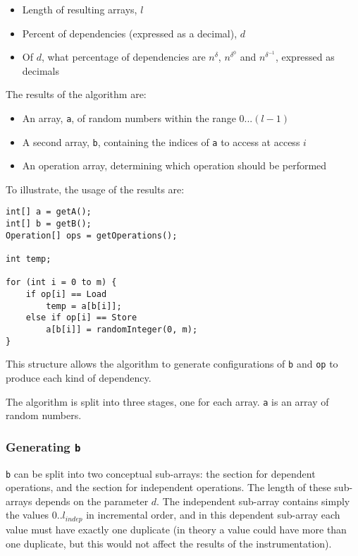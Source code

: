 	\begin{itemize}
		\item Length of resulting arrays, $l$
		\item Percent of dependencies (expressed as a decimal), $d$
		\item Of $d$, what percentage of dependencies are $n^{\delta}$, $n^{\delta^{0}}$ and $n^{\delta^{-1}}$, expressed as decimals
	\end{itemize}
	
	The results of the algorithm are:
	
	\begin{itemize}
		\item An array, \texttt{a}, of random numbers within the range $0...(l - 1)$
		\item A second array, \texttt{b}, containing the indices of \texttt{a} to access at access $i$
		\item An operation array, determining which operation should be performed
	\end{itemize}
	
	To illustrate, the usage of the results are:
	
	\begin{lstlisting}
int[] a = getA();
int[] b = getB();
Operation[] ops = getOperations();

int temp;

for (int i = 0 to m) {
    if op[i] == Load
        temp = a[b[i]];
    else if op[i] == Store
        a[b[i]] = randomInteger(0, m);
}\end{lstlisting}

	This structure allows the algorithm to generate configurations of \texttt{b} and \texttt{op} to produce each kind of dependency.
	
	The algorithm is split into three stages, one for each array. \texttt{a} is an array of random numbers.
	
		\subsubsection{Generating \texttt{b}} \label{sec:methodology/params/algo/gen-b}
		\texttt{b} can be split into two conceptual sub-arrays: the section for dependent operations, and the section for independent operations. The length of these sub-arrays depends on the parameter $d$. The independent sub-array contains simply the values $0..l_{indep}$ in incremental order, and in this dependent sub-array each value must have exactly one duplicate (in theory a value could have more than one duplicate, but this would not affect the results of the instrumentation).
		
